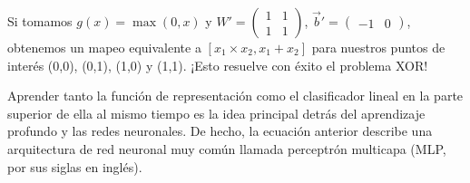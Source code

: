 Si tomamos $g(x) = \operatorname{max}(0, x)$ y $W' = \begin{pmatrix}
    1 & 1 \\ 1 & 1 \end{pmatrix}$, $\vec{b}' = \begin{pmatrix}
    -1 & 0 \end{pmatrix}$, obtenemos un mapeo equivalente a $[x_1 \times x_2, x_1 + x_2]$ para nuestros puntos de interés (0,0), (0,1), (1,0) y (1,1). ¡Esto resuelve con éxito el problema XOR!

Aprender tanto la función de representación como el clasificador lineal en la parte superior de ella al mismo tiempo es la idea principal detrás del aprendizaje profundo y las redes neuronales. De hecho, la ecuación anterior describe una arquitectura de red neuronal muy común llamada perceptrón multicapa (MLP, por sus siglas en inglés).
